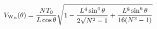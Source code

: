 \begin{equation}
V_{\rm W_B}(\theta)=\frac{NT_0}{L\cos{\theta}}\sqrt{1-\frac{L^4\sin^4{\theta}}
{2\sqrt{N^2-1}}+\frac{L^8\sin^6{\theta}}{16(N^2-1)}}
\end{equation}

